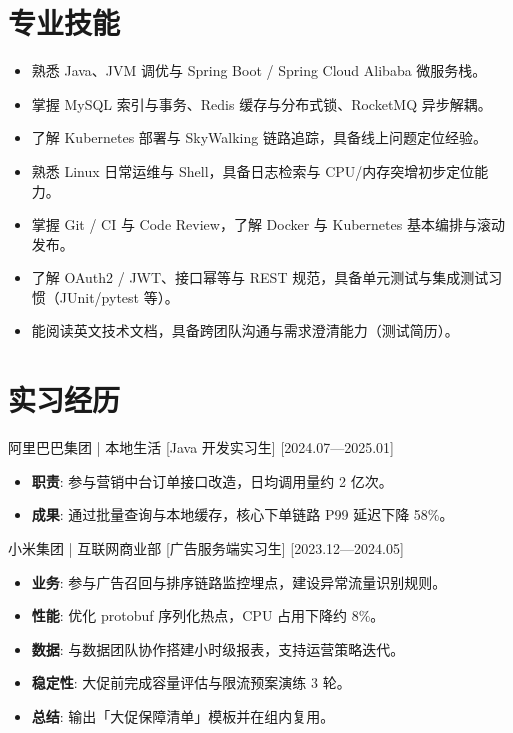 \documentclass{resume-photo}
\begin{document}
\section{专业技能}
\begin{itemize}
  \item 熟悉 Java、JVM 调优与 Spring Boot / Spring Cloud Alibaba 微服务栈。
  \item 掌握 MySQL 索引与事务、Redis 缓存与分布式锁、RocketMQ 异步解耦。
  \item 了解 Kubernetes 部署与 SkyWalking 链路追踪，具备线上问题定位经验。
  \item 熟悉 Linux 日常运维与 Shell，具备日志检索与 CPU/内存突增初步定位能力。
  \item 掌握 Git / CI 与 Code Review，了解 Docker 与 Kubernetes 基本编排与滚动发布。
  \item 了解 OAuth2 / JWT、接口幂等与 REST 规范，具备单元测试与集成测试习惯（JUnit/pytest 等）。
  \item 能阅读英文技术文档，具备跨团队沟通与需求澄清能力（测试简历）。
\end{itemize}

\section{实习经历}
\ResumeItem
{阿里巴巴集团 | 本地生活}
[\textnormal{Java 开发实习生}]
[2024.07—2025.01]

\begin{itemize}
  \item \textbf{职责}: 参与营销中台订单接口改造，日均调用量约 2 亿次。
  \item \textbf{成果}: 通过批量查询与本地缓存，核心下单链路 P99 延迟下降 58\%。
\end{itemize}


\ResumeItem
{小米集团 | 互联网商业部}
[\textnormal{广告服务端实习生}]
[2023.12—2024.05]

\begin{itemize}
  \item \textbf{业务}: 参与广告召回与排序链路监控埋点，建设异常流量识别规则。
  \item \textbf{性能}: 优化 protobuf 序列化热点，CPU 占用下降约 8\%。
  \item \textbf{数据}: 与数据团队协作搭建小时级报表，支持运营策略迭代。
  \item \textbf{稳定性}: 大促前完成容量评估与限流预案演练 3 轮。
  \item \textbf{总结}: 输出「大促保障清单」模板并在组内复用。
\end{itemize}
\end{document}
